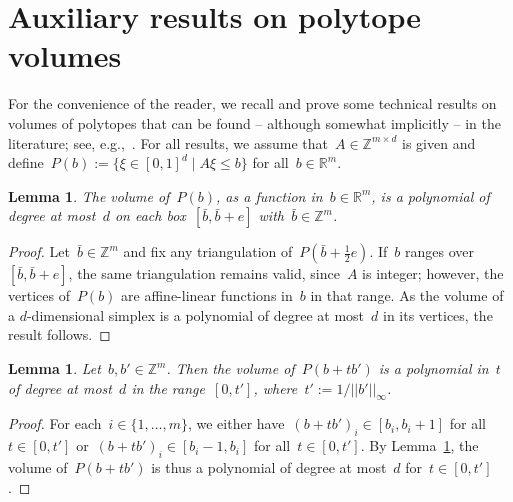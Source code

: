 \documentclass{article}
\newtheorem{lemma}[theorem]{Lemma}
\newcommand{\Z}{\mathbb{Z}}
\newcommand{\R}{\mathbb{R}}
\begin{document}



\appendix

\section{Auxiliary results on polytope volumes}\label{app}
For the convenience of the reader, we recall and prove some technical
results on volumes of polytopes that can be found -- although somewhat
implicitly -- in the literature; see,
e.g.,~\cite{Dyer88,Gritzmann94,Bueeler00}. For all results, we assume
that~$A\in\Z^{m\times d}$ is given and
define~$P(b):=\{\xi\in[0,1]^d\mid A\xi\le b\}$ for all~$b\in\R^m$.

\begin{lemma}\label{lem:p_poly}
  The volume of~$P(b)$, as a function in~$b\in\R^m$, is a polynomial
  of degree at most~$d$ on each box~$[\bar b,\bar b+e]$ with~$\bar
  b\in\Z^m$.
\end{lemma}
\begin{proof}
  Let~$\bar b\in\Z^m$ and fix any triangulation of~$P(\bar b+\tfrac
  12e)$. If~$b$ ranges over~$[\bar b,\bar b+e]$, the same
  triangulation remains valid, since~$A$ is integer; however, the
  vertices of~$P(b)$ are affine-linear functions in~$b$ in that
  range. As the volume of a $d$-dimensional simplex is a polynomial of
  degree at most~$d$ in its vertices, the result follows.
\end{proof}

\begin{lemma}\label{lem:polynomial}
  Let~$b,b'\in\Z^m$. Then the volume of~$P(b+tb')$ is a polynomial
  in~$t$ of degree at most~$d$ in the range~$[0,t']$,
  where~$t':=1/{||b'||_\infty}$.
\end{lemma}
\begin{proof}
  For each~$i\in\{1,\dots,m\}$, we either
  have~$(b+tb')_i\in[b_i,b_i+1]$ for all~$t\in[0,t']$
  or~$(b+tb')_i\in[b_i-1,b_i]$ for all~$t\in[0,t']$. By
  Lemma~\ref{lem:p_poly}, the volume of~$P(b+tb')$ is thus a
  polynomial of degree at most~$d$ for~$t\in[0,t']$.
\end{proof}
\end{document}
